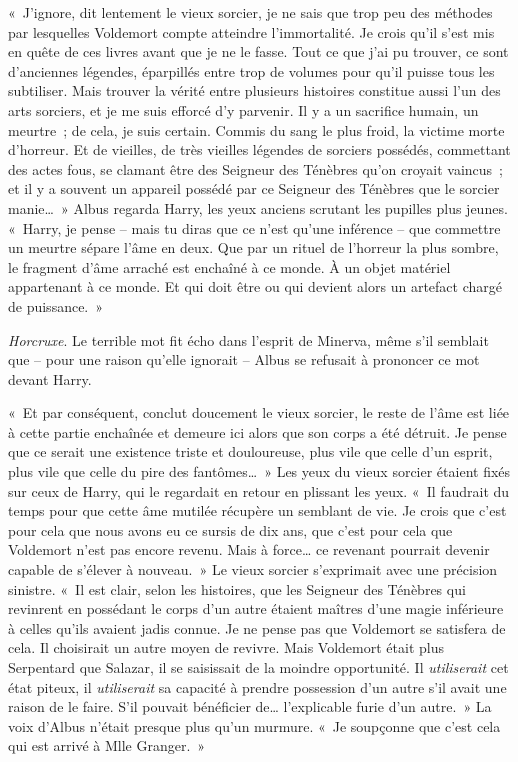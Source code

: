 «~J'ignore, dit lentement le vieux sorcier, je ne sais que trop peu des méthodes par lesquelles Voldemort compte atteindre l'immortalité.
Je crois qu'il s'est mis en quête de ces livres avant que je ne le fasse.
Tout ce que j'ai pu trouver, ce sont d'anciennes légendes, éparpillés entre trop de volumes pour qu'il puisse tous les subtiliser.
Mais trouver la vérité entre plusieurs histoires constitue aussi l'un des arts sorciers, et je me suis efforcé d'y parvenir.
Il y a un sacrifice humain, un meurtre~; de cela, je suis certain.
Commis du sang le plus froid, la victime morte d'horreur.
Et de vieilles, de très vieilles légendes de sorciers possédés, commettant des actes fous, se clamant être des Seigneur des Ténèbres qu'on croyait vaincus~; et il y a souvent un appareil possédé par ce Seigneur des Ténèbres que le sorcier manie…~»
Albus regarda Harry, les yeux anciens scrutant les pupilles plus jeunes.
«~Harry, je pense -- mais tu diras que ce n'est qu'une inférence -- que commettre un meurtre sépare l'âme en deux.
Que par un rituel de l'horreur la plus sombre, le fragment d'âme arraché est enchaîné à ce monde.
À un objet matériel appartenant à ce monde.
Et qui doit être ou qui devient alors un artefact chargé de puissance.~»

\emph{Horcruxe}.
Le terrible mot fit écho dans l'esprit de Minerva, même s'il semblait que -- pour une raison qu'elle ignorait -- Albus se refusait à prononcer ce mot devant Harry.

«~Et par conséquent, conclut doucement le vieux sorcier, le reste de l'âme est liée à cette partie enchaînée et demeure ici alors que son corps a été détruit.
Je pense que ce serait une existence triste et douloureuse, plus vile que celle d'un esprit, plus vile que celle du pire des fantômes…~»
Les yeux du vieux sorcier étaient fixés sur ceux de Harry, qui le regardait en retour en plissant les yeux.
«~Il faudrait du temps pour que cette âme mutilée récupère un semblant de vie.
Je crois que c'est pour cela que nous avons eu ce sursis de dix ans, que c'est pour cela que Voldemort n'est pas encore revenu.
Mais à force… ce revenant pourrait devenir capable de s'élever à nouveau.~»
Le vieux sorcier s'exprimait avec une précision sinistre.
«~Il est clair, selon les histoires, que les Seigneur des Ténèbres qui revinrent en possédant le corps d'un autre étaient maîtres d'une magie inférieure à celles qu'ils avaient jadis connue.
Je ne pense pas que Voldemort se satisfera de cela.
Il choisirait un autre moyen de revivre.
Mais Voldemort était plus Serpentard que Salazar, il se saisissait de la moindre opportunité.
Il \emph{utiliserait} cet état piteux, il \emph{utiliserait} sa capacité à prendre possession d'un autre s'il avait une raison de le faire.
S'il pouvait bénéficier de… l'explicable furie d'un autre.~»
La voix d'Albus n'était presque plus qu'un murmure.
«~Je soupçonne que c'est cela qui est arrivé à Mlle Granger.~»

